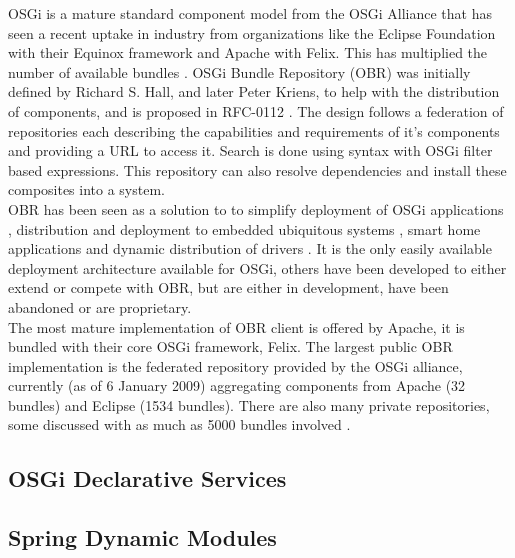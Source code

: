 OSGi is a 
mature standard component model from the OSGi Alliance that has seen a recent uptake in industry \cite{kriens_osgi_2008} 
from organizations like the Eclipse Foundation with their Equinox framework and Apache with Felix. This has multiplied the 
number of available bundles \cite{the_osgi_alliance_rfc-0112_2006}. OSGi Bundle Repository (OBR) was initially defined by 
Richard S. Hall, and later Peter Kriens, to help with the distribution of components, and is proposed in 
RFC-0112 \cite{the_osgi_alliance_rfc-0112_2006}. The design follows a federation of repositories each describing 
the capabilities and requirements of it's components and providing a URL to access it. Search is done using syntax with OSGi filter 
based expressions. This repository can also resolve dependencies and install these composites into a system. \\
OBR has been seen as a solution to to simplify deployment of OSGi applications
\cite{jung_integrating_2007}, distribution and deployment to embedded
ubiquitous systems \cite{jung_embedded_2006}, smart home applications \cite{gouin-vallerand_managing_2007} and 
dynamic distribution of drivers \cite{kriens_osgi_2008}. It is the only easily available deployment 
architecture available for OSGi, others have been developed to either extend or compete \cite{frnot_component_2005} with OBR, 
but are either in development, have been abandoned or are proprietary.\\ 
The most mature implementation of OBR client is offered by Apache, it is bundled with their core OSGi framework, Felix. 
The largest public OBR implementation is the federated repository provided by the OSGi alliance,
currently (as of 6 January 2009) aggregating components from Apache (32 bundles) and Eclipse (1534 bundles).
There are also many private repositories, some discussed with as much as 5000 bundles involved \cite{kriens_osgi_2008}.\\  

\subsection{OSGi Declarative Services}

\subsection{Spring Dynamic Modules}

